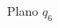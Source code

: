 \documentclass[a4paper,12pt]{article}
\begin{document}
\begin{figure}[H]
    \centering
    \begin{adjustbox}{max width=\columnwidth}
    \end{adjustbox}
    \caption{Plano $q_{6}$}
    \label{plano q6}
\end{figure}





\end{document}
